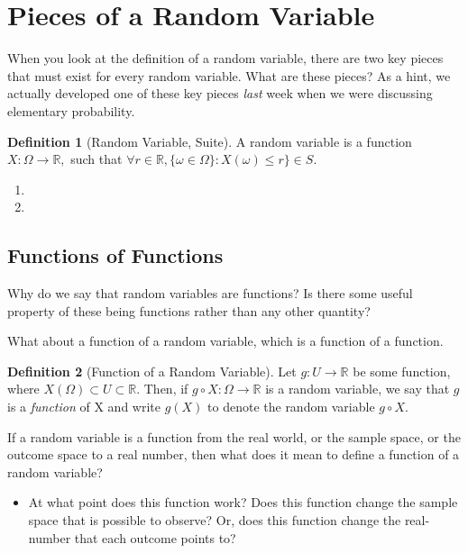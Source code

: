 \documentclass[
]{book}
\providecommand{\tightlist}{%
  \setlength{\itemsep}{0pt}\setlength{\parskip}{0pt}}
\theoremstyle{definition}
\newtheorem{definition}{Definition}[chapter]
\theoremstyle{definition}
\theoremstyle{definition}
\theoremstyle{definition}
\theoremstyle{remark}
\begin{document}
\hypertarget{pieces-of-a-random-variable}{%
\section{Pieces of a Random Variable}\label{pieces-of-a-random-variable}}

When you look at the definition of a random variable, there are two key pieces that must exist for every random variable. What are these pieces? As a hint, we actually developed one of these key pieces \emph{last} week when we were discussing elementary probability.

\begin{definition}[Random Variable, Suite]
A random variable is a function \(X : \Omega \rightarrow \mathbb{R},\) such that \(\forall r \in \mathbb{R}, \{\omega \in \Omega\}: X(\omega) \leq r\} \in S\).
\end{definition}

\begin{enumerate}
\def\labelenumi{\arabic{enumi}.}
\tightlist
\item
\item
\end{enumerate}

\hypertarget{functions-of-functions}{%
\subsection{Functions of Functions}\label{functions-of-functions}}

Why do we say that random variables are functions? Is there some useful property of these being functions rather than any other quantity?

What about a function of a random variable, which is a function of a function.

\begin{definition}[Function of a Random Variable]
Let \(g : U \rightarrow \mathbb{R}\) be some function, where \(X(\Omega) \subset U \subset \mathbb{R}\). Then, if \(g \circ X : \Omega \rightarrow \mathbb{R}\) is a random variable, we say that \(g\) is a \emph{function} of X and write \(g(X)\) to denote the random variable \(g \circ X\).
\end{definition}

If a random variable is a function from the real world, or the sample space, or the outcome space to a real number, then what does it mean to define a function of a random variable?

\begin{itemize}
\tightlist
\item
  At what point does this function work? Does this function change the sample space that is possible to observe? Or, does this function change the real-number that each outcome points to?
\end{itemize}
\end{document}
